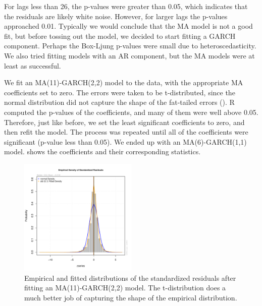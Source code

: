 \documentclass[12pt]{article}
\begin{document}
For lags less than 26, the p-values were greater than 0.05, which indicates that the residuals are likely white noise. However, for larger lags the p-values approached 0.01. Typically we would conclude that the MA model is not a good fit, but before tossing out the model, we decided to start fitting a GARCH component. Perhaps the Box-Ljung p-values were small due to heteroscedasticity. We also tried fitting models with an AR component, but the MA models were at least as successful. 

We fit an MA(11)-GARCH(2,2) model to the data, with the appropriate MA coefficients set to zero. The errors were taken to be t-distributed, since the normal distribution did not capture the shape of the fat-tailed errors (). R computed the p-values of the coefficients, and many of them were well above 0.05. Therefore, just like before, we set the least significant coefficients to zero, and then refit the model. The process was repeated until all of the coefficients were significant (p-value less than 0.05). We ended up with an MA(6)-GARCH(1,1) model.  shows the coefficients and their corresponding statistics.

\begin{figure}[h]
    \centering
    \includegraphics[width=0.5\textwidth]{garch_22_residuals.pdf}
    \caption{Empirical and fitted distributions of the standardized residuals after fitting an MA(11)-GARCH(2,2) model. The t-distribution does a much better job of capturing the shape of the empirical distribution.}
    \label{fig:garch_22_residuals}
\end{figure}
\end{document}
